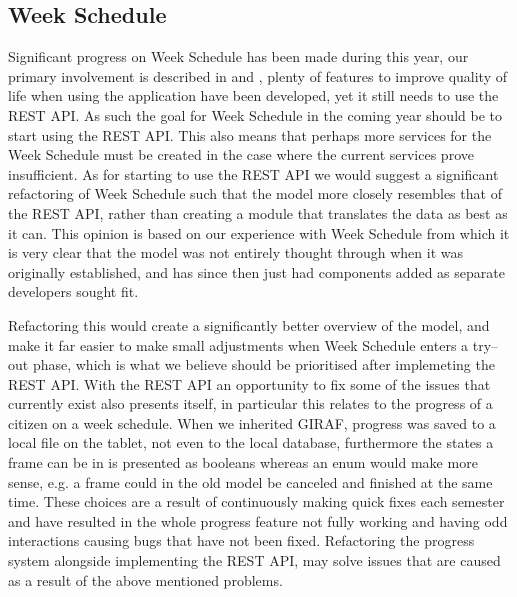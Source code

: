 \subsection*{Week Schedule}
Significant progress on Week Schedule has been made during this year, our primary involvement is described in  and , plenty of features to improve quality of life when using the application have been developed, yet it still needs to use the REST API.
As such the goal for Week Schedule in the coming year should be to start using the REST API.
This also means that perhaps more services for the Week Schedule must be created in the case where the current services prove insufficient.
As for starting to use the REST API we would suggest a significant refactoring of Week Schedule such that the model more closely resembles that of the REST API, rather than creating a module that translates the data as best as it can.
This opinion is based on our experience with Week Schedule from which it is very clear that the model was not entirely thought through when it was originally established, and has since then just had components added as separate developers sought fit.

Refactoring this would create a significantly better overview of the model, and make it far easier to make small adjustments when Week Schedule enters a try--out phase, which is what we believe should be prioritised after implemeting the REST API.
With the REST API an opportunity to fix some of the issues that currently exist also presents itself, in particular this relates to the progress of a citizen on a week schedule.
When we inherited GIRAF, progress was saved to a local file on the tablet, not even to the local database, furthermore the states a frame can be in is presented as booleans whereas an enum would make more sense, e.g. a frame could in the old model be canceled and finished at the same time.
These choices are a result of continuously making quick fixes each semester and have resulted in the whole progress feature not fully working and having odd interactions causing bugs that have not been fixed.
Refactoring the progress system alongside implementing the REST API, may solve issues that are caused as a result of the above mentioned problems.


